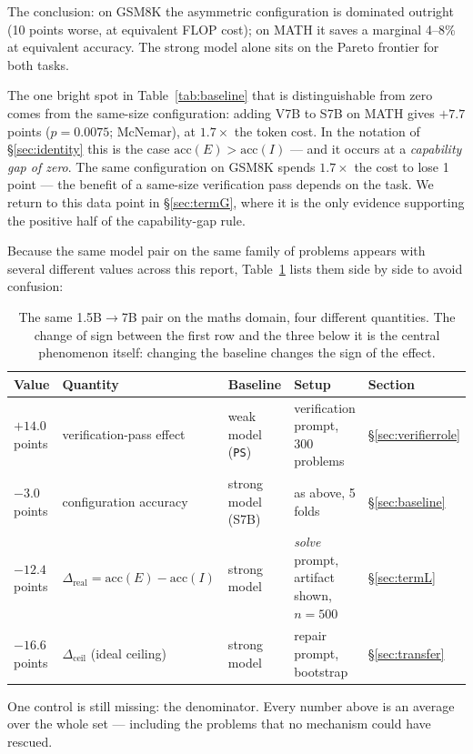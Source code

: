 \documentclass[11pt,a4paper]{article}
\newcommand{\dceil}{\Delta_{\mathrm{ceil}}}
\newcommand{\dhonest}{\Delta_{\mathrm{real}}}
\newcommand{\acc}{\mathrm{acc}}
\begin{document}
The conclusion: on GSM8K the asymmetric configuration is dominated outright (10 points worse, at equivalent FLOP cost); on MATH it saves a marginal 4--8\% at equivalent accuracy. The strong model alone sits on the Pareto frontier for both tasks.

The one bright spot in Table~\ref{tab:baseline} that is distinguishable from zero comes from the same-size configuration: adding V7B to S7B on MATH gives $+7.7$ points ($p=0.0075$; McNemar), at $1.7\times$ the token cost. In the notation of \S\ref{sec:identity} this is the case $\acc(E) > \acc(I)$ --- and it occurs at a \emph{capability gap of zero}. The same configuration on GSM8K spends $1.7\times$ the cost to lose 1 point --- the benefit of a same-size verification pass depends on the task. We return to this data point in \S\ref{sec:termG}, where it is the only evidence supporting the positive half of the capability-gap rule.

Because the same model pair on the same family of problems appears with several different values across this report, Table~\ref{tab:doichieu} lists them side by side to avoid confusion:

\begin{table}[h]\centering\small
\begin{tabular}{@{}l l l l l@{}}
\toprule
Value & Quantity & Baseline & Setup & Section\\
\midrule
$+14.0$ points & verification-pass effect & weak model (\texttt{PS}) & verification prompt, 300 problems & \S\ref{sec:verifierrole}\\
$-3.0$ points & configuration accuracy & strong model (S7B) & as above, 5 folds & \S\ref{sec:baseline}\\
$-12.4$ points & $\dhonest = \acc(E)-\acc(I)$ & strong model & \emph{solve} prompt, artifact shown, $n=500$ & \S\ref{sec:termL}\\
$-16.6$ points & $\dceil$ (ideal ceiling) & strong model & repair prompt, bootstrap & \S\ref{sec:transfer}\\
\bottomrule
\end{tabular}
\caption{The same 1.5B$\to$7B pair on the maths domain, four different quantities. The change of sign between the first row and the three below it is the central phenomenon itself: changing the baseline changes the sign of the effect.}
\label{tab:doichieu}
\end{table}

One control is still missing: the denominator. Every number above is an average over the whole set --- including the problems that no mechanism could have rescued.
\end{document}
